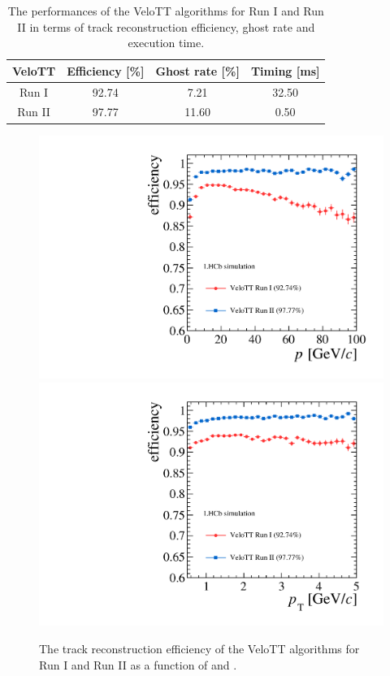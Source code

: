 \begin{table}[!b]
\caption{The performances of the VeloTT algorithms for Run I and Run II in terms of track reconstruction efficiency, ghost rate and execution time.}
\label{tab:perf_velott_comp}
\begin{center}
  \begin{tabular}{c|c|c|c}
    VeloTT & Efficiency [\%] & Ghost rate [\%] & Timing [ms] \\ 
    \hline
    Run I  &  92.74  &  \hphantom{0}7.21  &  32.50  \\ 
    Run II  &  97.77  &  11.60  &  \hphantom{0}0.50   \\ 
  \end{tabular}
\end{center}
\end{table}

\begin{figure}[!tb]
\begin{center}
  \includegraphics[width=0.45\linewidth]{figs/upstream-tracking-run2/VeloTT-eff-p.pdf}
  \includegraphics[width=0.45\linewidth]{figs/upstream-tracking-run2/VeloTT-eff-pt.pdf}
  \caption{The track reconstruction efficiency of the VeloTT algorithms for Run I and Run II as a function of \ptot and \pt.}
  \label{fig:eff_velott_comp}
  \end{center}
\end{figure}

